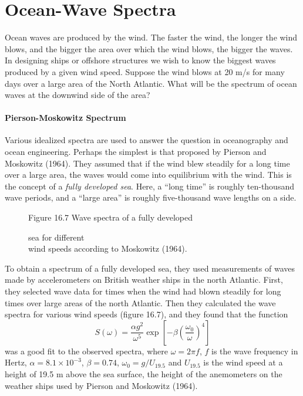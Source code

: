\section{Ocean-Wave Spectra}
Ocean waves are produced by the wind. The faster
the wind, the longer the wind blows, and the bigger the area over
which the wind blows, the bigger the waves. In designing ships or
offshore structures we wish to know the biggest waves produced by a
given wind speed. Suppose the wind blows at 20 m/s for many days over
a large area of the North Atlantic. What will be the spectrum of ocean
waves at the downwind side of the area?

\paragraph{Pierson-Moskowitz Spectrum}
Various idealized spectra are
used to answer the question in ocean\-ography and ocean
engineering. Perhaps the simplest is that proposed by Pierson and
Moskowitz (1964). They assumed that if the wind blew steadily for a
long time over a large area, the waves would come into equilibrium
with the wind. This is the concept of a \textit{fully developed
  sea}. Here, a ``long time'' is
roughly ten-thousand wave periods, and a ``large area'' is roughly
five-thousand wave lengths on a side.

\begin{figure}[t!]
\footnotesize
\centering
Figure 16.7 Wave spectra of a fully developed \rule{0mm}{4ex}sea for
different\\wind speeds according to Moskowitz (1964).

\label{fig:PMSpectra}
\vspace{-2ex}
\end{figure}

To obtain a spectrum of a fully developed sea, they used measurements
of waves made by accelerometers on British weather ships in the north
Atlantic. First, they selected wave data for times when the wind had
blown steadily for long times over large areas of the north
Atlantic. Then they calculated the wave spectra for various wind
speeds (figure 16.7), and they found that the function
\begin{equation}
S(\omega) = \frac{\alpha g^{2}}{\omega ^{5}} \exp \left[ - \beta \left(
\frac{\omega _{0}}{\omega } \right) ^{4} \right]
\end{equation}
was a good fit to the observed spectra, where $\omega = 2\pi f$, $f$
is the wave frequency in Hertz, $\alpha = 8.1 \times 10^{-3}$, $\beta = 0.74 $,
$\omega _{0} = g/U_{19.5}$ and $U_{19.5}$ is the wind speed
at a height of 19.5 m above the sea surface, the height of the
anemometers on the weather ships used by Pierson and Moskowitz (1964).

